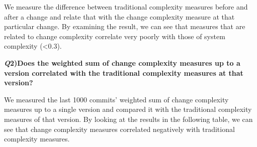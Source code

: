 \documentclass[9pt,twocolumn,a4paper]{article}
\begin{document}
We measure the difference between traditional complexity measures before and after a change and relate that with the change complexity measure at that particular change. By examining the result, we can see that measures that are related to change complexity correlate very poorly with those of system complexity (\textless 0.3).
\newline

\begin{table}[ht]

\centering
{}
\caption {\small Correlation Matrix of Research Question 1.}
\label{tab:title} 
\end{table}

{\bf{\emph Q2)Does the weighted sum of change complexity measures up to a version correlated with the traditional complexity measures at that version? }}
\newline

We measured the last 1000 commits’ weighted sum of change complexity measures up to a single version and compared it with the traditional complexity measures of that version. By looking at the results in the following table, we can see that change complexity measures correlated negatively with traditional complexity measures.
\newline
\end{document}
